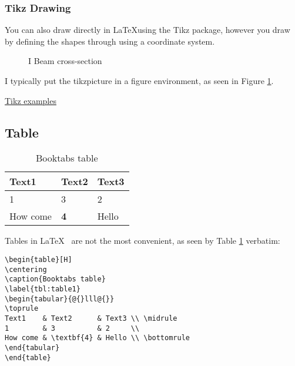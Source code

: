 \documentclass[11pt,a4paper,titlepage]{article}
\begin{document}
\subsubsection{Tikz Drawing}
You can also draw directly in \LaTeX using the Tikz package, however you draw by defining the shapes through using a coordinate system.


\begin{figure} [H]
\centering

\caption{I Beam cross-section}
\label{fig:I_beam}
\end{figure}


I typically put the tikzpicture in a figure environment, as seen in Figure \ref{fig:I_beam}.

\href{http://texample.net/tikz/}{Tikz examples}

\subsection{Table}

\begin{table}[H]
\centering
\caption{Booktabs table}
\label{tbl:table1}
\begin{tabular}{@{}lll@{}}
\toprule
Text1    & Text2      & Text3 \\ \midrule
1        & 3          & 2     \\
How come & \textbf{4} & Hello \\ \bottomrule
\end{tabular}
\end{table}


Tables in \LaTeX \ %
are not the most convenient, as seen by Table \ref{tbl:table1} verbatim:

\begin{verbatim}
\begin{table}[H]
\centering
\caption{Booktabs table}
\label{tbl:table1}
\begin{tabular}{@{}lll@{}}
\toprule
Text1    & Text2      & Text3 \\ \midrule
1        & 3          & 2     \\
How come & \textbf{4} & Hello \\ \bottomrule
\end{tabular}
\end{table}
\end{verbatim}
\end{document}
